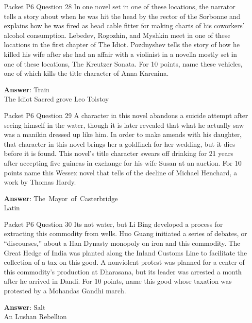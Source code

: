 \begin{frame}{Packet P6 Question 28}
In one novel set in one of these locations, the narrator tells a story about when he was hit the head by the rector of the Sorbonne and explains how he was fired as head cable fitter for making charts of his coworkers' alcohol   consumption. Lebedev, Rogozhin, and Myshkin meet in one   of these locations in the first chapter   of The Idiot. Pozdnyshev tells the story of how he killed his wife after she had an affair with a violinist in a novella mostly set in one of these locations, The Kreutzer Sonata. For 10 points, name these vehicles, one of which kills the title character of Anna Karenina.  

\textbf{Answer}: Train\\
 The Idiot
 Sacred grove
 Leo Tolstoy
\end{frame}

\begin{frame}{Packet P6 Question 29}
A character in this novel   abandons a suicide attempt after seeing himself in the water, though it is later revealed that what he actually saw was a manikin dressed up like him. In order to make amends with his daughter, that character in this novel brings her a goldfinch for her wedding, but it dies before it is found. This novel's title character swears off drinking for 21 years after accepting five guineas in exchange     for his wife Susan at an auction. For   10 points name this Wessex novel that tells of  the decline of Michael Henchard,   a work by Thomas Hardy.

\textbf{Answer}: The\ Mayor\ of\ Casterbridge\\
 Latin
\end{frame}

\begin{frame}{Packet P6 Question 30}
Its not water, but Li   Bing developed a process for extracting this commodity from wells. Huo Guang initiated       a series of debates, or ``discourses,'' about a Han Dynasty monopoly on iron and this commodity. The Great Hedge of India was planted along the Inland Customs Line to facilitate the collection of a tax on this good. A nonviolent protest was planned for a center of this commodity's production at Dharasana, but its leader was arrested a month after he arrived in Dandi. For 10 points, name this good whose taxation was protested by a Mohandas   Gandhi march.

\textbf{Answer}: Salt\\
 An Lushan Rebellion
\end{frame}

